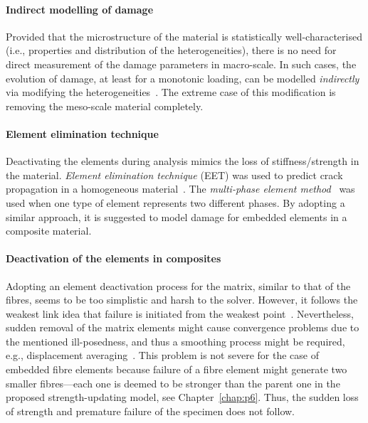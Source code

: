 	\paragraph{Indirect modelling of damage} Provided that the microstructure of the material is statistically well-characterised (i.e., properties and distribution of the heterogeneities), there is no need for direct measurement of the damage parameters in macro-scale. In such cases, the evolution of damage, at least for a monotonic loading, can be modelled \textit{indirectly} via modifying the heterogeneities~\autocite{Bazant.1998}. The extreme case of this modification is removing the meso-scale material completely. 
	
	\paragraph{Element elimination technique} Deactivating the elements during analysis mimics the loss of stiffness/strength in the material. \textit{Element elimination technique} (EET) was used to predict crack propagation in a homogeneous material~\parencite{Wulf.1994}. The \textit{multi-phase element method}~\parencite{Steinkopff.1995} was used when one type of element represents two different phases. By adopting a similar approach, it is suggested to model damage for embedded elements in a composite material.
	
	\paragraph{Deactivation of the elements in composites} Adopting an element deactivation process for the matrix, similar to that of the fibres, seems to be too simplistic and harsh to the solver. However, it follows the weakest link idea that failure is initiated from the weakest point~\parencite{Jirasek.2007}.	Nevertheless, sudden removal of the matrix elements might cause convergence problems due to the mentioned ill-posedness, and thus a smoothing process might be required, e.g., displacement averaging~\parencite{Jirasek.2005}. This problem is not severe for the case of embedded fibre elements because failure of a fibre element might generate two smaller fibres---each one is deemed to be stronger than the parent one in the proposed strength-updating model, see Chapter~\ref{chap:p6}. Thus, the sudden loss of strength and premature failure of the specimen does not follow. 
 



